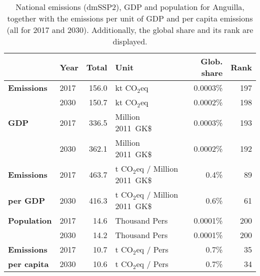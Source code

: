 \documentclass[12pt]{article}
\begin{document}
 \begin{table}[htbp]
 \centering
 \caption{National emissions (dmSSP2), GDP and population for Anguilla, together with the emissions per unit of GDP and per capita emissions (all for 2017 and 2030). 
 Additionally, the global share and its rank are displayed.}
 \label{tab:overview}
 \begin{tabular}{l || l r l r r}
 \bfseries  & \bfseries Year & \bfseries Total & \bfseries Unit & \bfseries Glob. share & \bfseries Rank \tabularnewline \hline \hline
 \bfseries Emissions & 2017 & 156.0 & kt CO$_2$eq & 0.0003\% & 197 \tabularnewline 
 \bfseries  & 2030 & 150.7 & kt CO$_2$eq & 0.0002\% & 198 \tabularnewline \hline
 \bfseries GDP & 2017 & 336.5 & Million 2011~GK\$ & 0.0003\% & 193 \tabularnewline 
 \bfseries  & 2030 & 362.1 & Million 2011~GK\$ & 0.0002\% & 192 \tabularnewline \hline
 \bfseries Emissions & 2017 & 463.7 & t CO$_2$eq / Million 2011~GK\$ & 0.4\% & 89 \tabularnewline 
 \bfseries per GDP & 2030 & 416.3 & t CO$_2$eq / Million 2011~GK\$ & 0.6\% & 61 \tabularnewline \hline
 \bfseries Population & 2017 & 14.6 & Thousand Pers & 0.0001\% & 200 \tabularnewline 
 \bfseries  & 2030 & 14.2 & Thousand Pers & 0.0001\% & 200 \tabularnewline \hline
 \bfseries Emissions & 2017 & 10.7 & t CO$_2$eq /  Pers & 0.7\% & 35 \tabularnewline 
 \bfseries per capita & 2030 & 10.6 & t CO$_2$eq /  Pers & 0.7\% & 34 \tabularnewline 
 \end{tabular}
 \end{table}
\end{document}
